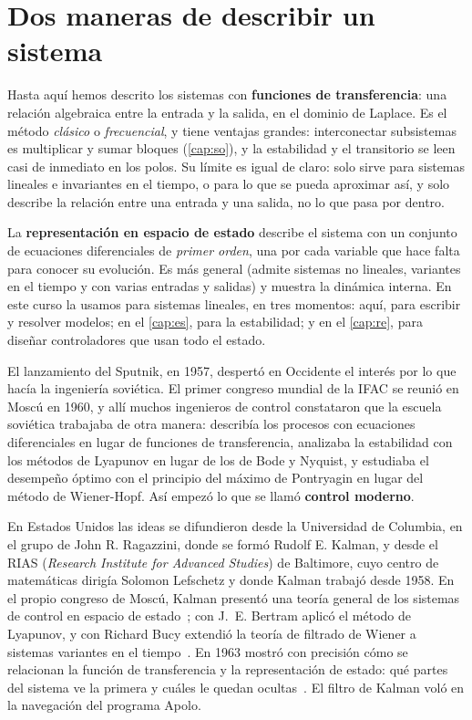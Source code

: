 \section{Dos maneras de describir un sistema}
\label{sec:ee-intro}

Hasta aquí hemos descrito los sistemas con \textbf{funciones de transferencia}: una relación algebraica entre la entrada y la salida, en el dominio de Laplace. Es el método \emph{clásico} o \emph{frecuencial}, y tiene ventajas grandes: interconectar subsistemas es multiplicar y sumar bloques (\cref{cap:so}), y la estabilidad y el transitorio se leen casi de inmediato en los polos. Su límite es igual de claro: solo sirve para sistemas lineales e invariantes en el tiempo, o para lo que se pueda aproximar así, y solo describe la relación entre una entrada y una salida, no lo que pasa por dentro.

La \textbf{representación en espacio de estado} describe el sistema con un conjunto de ecuaciones diferenciales de \emph{primer orden}, una por cada variable que hace falta para conocer su evolución. Es más general (admite sistemas no lineales, variantes en el tiempo y con varias entradas y salidas) y muestra la dinámica interna. En este curso la usamos para sistemas lineales, en tres momentos: aquí, para escribir y resolver modelos; en el \cref{cap:es}, para la estabilidad; y en el \cref{cap:re}, para diseñar controladores que usan todo el estado.

\begin{historia}
El lanzamiento del Sputnik, en 1957, despertó en Occidente el interés por lo que hacía la ingeniería soviética. El primer congreso mundial de la IFAC se reunió en Moscú en 1960, y allí muchos ingenieros de control constataron que la escuela soviética trabajaba de otra manera: describía los procesos con ecuaciones diferenciales en lugar de funciones de transferencia, analizaba la estabilidad con los métodos de Lyapunov en lugar de los de Bode y Nyquist, y estudiaba el desempeño óptimo con el principio del máximo de Pontryagin en lugar del método de Wiener-Hopf. Así empezó lo que se llamó \textbf{control moderno}.

En Estados Unidos las ideas se difundieron desde la Universidad de Columbia, en el grupo de John R. Ragazzini, donde se formó Rudolf E. Kalman, y desde el RIAS (\emph{Research Institute for Advanced Studies}) de Baltimore, cuyo centro de matemáticas dirigía Solomon Lefschetz y donde Kalman trabajó desde 1958. En el propio congreso de Moscú, Kalman presentó una teoría general de los sistemas de control en espacio de estado~\citep{Kal60}; con J.~E. Bertram aplicó el método de Lyapunov, y con Richard Bucy extendió la teoría de filtrado de Wiener a sistemas variantes en el tiempo~\citep{KaBu61}. En 1963 mostró con precisión cómo se relacionan la función de transferencia y la representación de estado: qué partes del sistema ve la primera y cuáles le quedan ocultas~\citep{Kal63}. El filtro de Kalman voló en la navegación del programa Apolo.
\end{historia}

